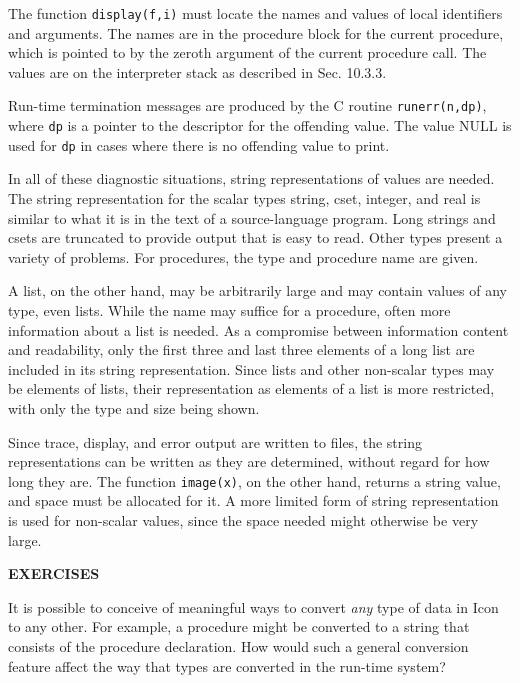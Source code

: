 The function \texttt{display(f,i)} must locate the names and values of
local identifiers and arguments. The names are in the procedure block
for the current procedure, which is pointed to by the zeroth argument
of the current procedure call. The values are on the interpreter stack
as described in Sec. 10.3.3.

Run-time termination messages are produced by the C routine
\texttt{runerr(n,dp)}, where \texttt{dp} is a pointer to the
descriptor for the offending value. The value NULL is used for
\texttt{dp} in cases where there is no offending value to print.

In all of these diagnostic situations, string representations of
values are needed. The string representation for the
{\textquotedbl}scalar{\textquotedbl} types string, cset, integer, and
real is similar to what it is in the text of a source-language
program. Long strings and csets are truncated to provide output that
is easy to read. Other types present a variety of problems. For
procedures, the type and procedure name are given.

A list, on the other hand, may be arbitrarily large and may contain
values of any type, even lists. While the name may suffice for a
procedure, often more information about a list is needed. As a
compromise between information content and readability, only the first
three and last three elements of a long list are included in its
string representation.  Since lists and other non-scalar types may be
elements of lists, their representation as elements of a list is more
restricted, with only the type and size being shown.

Since trace, display, and error output are written to files, the
string representations can be written as they are determined, without
regard for how long they are. The function \texttt{image(x)}, on the
other hand, returns a string value, and space must be allocated for
it. A more limited form of string representation is used for
non-scalar values, since the space needed might otherwise be very
large.

\bigskip

\noindent\textbf{EXERCISES}

 It is possible to conceive of meaningful ways to convert
\textit{any} type of data in Icon to any other. For example, a
procedure might be converted to a string that consists of the
procedure declaration. How would such a general conversion feature
affect the way that types are converted in the run-time system?

